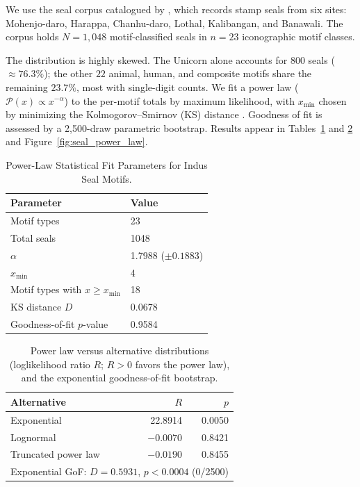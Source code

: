 \documentclass[12pt]{article}
\begin{document}
We use the seal corpus catalogued by \citet{ameri2013regional}, which records
stamp seals from six sites: Mohenjo-daro, Harappa, Chanhu-daro, Lothal,
Kalibangan, and Banawali.  The corpus holds $N = 1{,}048$ motif-classified
seals in $n = 23$ iconographic motif classes.

The distribution is highly skewed. The Unicorn alone accounts for $800$
seals ($\approx 76.3\%$); the other $22$ animal, human, and composite
motifs share the remaining $23.7\%$, most with single-digit counts.
We fit a power law ($\mathcal{P}(x) \propto x^{-\alpha}$) to the per-motif
totals by maximum likelihood, with $x_{\min}$ chosen by minimizing the
Kolmogorov--Smirnov (KS) distance \citep{clauset2009power,alstott2014powerlaw}.
Goodness of fit is assessed by a 2{,}500-draw parametric bootstrap. Results
appear in Tables~\ref{tab:powerlaw_stats} and
\ref{tab:model_comparison} and Figure~\ref{fig:seal_power_law}.

\begin{table}[htbp]
\centering
\caption{Power-Law Statistical Fit Parameters for Indus Seal Motifs.}
\label{tab:powerlaw_stats}
\begin{tabular}{ll}
\toprule
\textbf{Parameter} & \textbf{Value} \\
\midrule
Motif types & 23 \\
Total seals & 1048 \\
$\alpha$ & 1.7988 ($\pm 0.1883$) \\
$x_{\text{min}}$ & 4 \\
Motif types with $x \ge x_{\text{min}}$ & 18 \\
KS distance $D$ & 0.0678 \\
Goodness-of-fit $p$-value & 0.9584 \\
\bottomrule
\end{tabular}
\end{table}

\begin{table}[htbp]
\centering
\caption{Power law versus alternative distributions (loglikelihood ratio $R$; $R>0$ favors the power law), and the exponential goodness-of-fit bootstrap.}
\label{tab:model_comparison}
\begin{tabular}{lrr}
\toprule
\textbf{Alternative} & \textbf{$R$} & \textbf{$p$} \\
\midrule
Exponential & 22.8914 & 0.0050 \\
Lognormal & $-0.0070$ & 0.8421 \\
Truncated power law & $-0.0190$ & 0.8455 \\
\midrule
\multicolumn{3}{l}{Exponential GoF: $D = 0.5931$, $p < 0.0004$ (0/2500)} \\
\bottomrule
\end{tabular}
\end{table}
\end{document}
